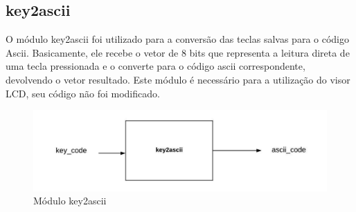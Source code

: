 \documentclass[a4paper,12pt,twoside]{article}
\begin{document}
\subsection{key2ascii}
O módulo key2ascii foi utilizado para a conversão das teclas salvas para o código Ascii. Basicamente, ele recebe o vetor de 8 bits que representa a leitura direta de uma tecla pressionada e o converte para o código ascii correspondente, devolvendo o vetor resultado. Este módulo é necessário para a utilização do visor LCD, seu código não foi modificado.

\begin{figure}[H]
\centering
\includegraphics[scale=0.6]{key2ascii.jpeg}
\caption{Módulo key2ascii}
\label{fig:key2ascii}
\end{figure}
\end{document}
